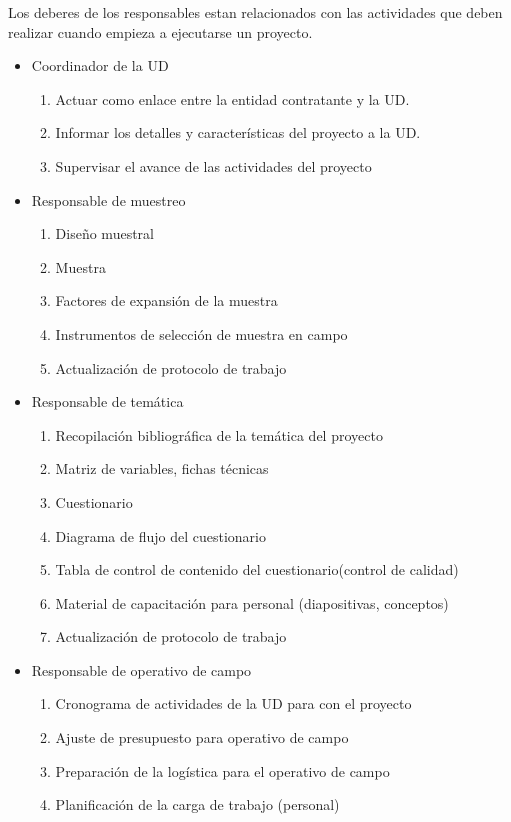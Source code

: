 \documentclass{article}
\begin{document}
Los deberes de los responsables estan relacionados con las actividades que deben realizar cuando empieza a ejecutarse un proyecto.

\begin{itemize}
\item Coordinador de la UD
\begin{enumerate}
\item Actuar como enlace entre la entidad contratante y la UD. 
\item Informar los detalles y características del proyecto a la UD.
\item Supervisar el avance de las actividades del proyecto
\end{enumerate}
\item Responsable de muestreo
\begin{enumerate}
\item Diseño muestral
\item Muestra
\item Factores de expansión de la muestra 
\item Instrumentos de selección de muestra en campo
\item Actualización de protocolo de trabajo
\end{enumerate}
\item Responsable de temática
\begin{enumerate}
\item Recopilación bibliográfica de la temática del proyecto
\item Matriz de variables, fichas técnicas
\item Cuestionario
\item Diagrama de flujo del cuestionario 
\item Tabla de control de contenido del cuestionario(control de calidad)
\item Material de capacitación para personal (diapositivas, conceptos)
\item Actualización de protocolo de trabajo
\end{enumerate}
\item Responsable de operativo de campo
\begin{enumerate}
\item Cronograma de actividades de la UD para con el proyecto
\item Ajuste de presupuesto para operativo de campo
\item Preparación de la logística para el operativo de campo
\item Planificación de la carga de trabajo (personal)

\end{enumerate}
\end{itemize}
\end{document}
